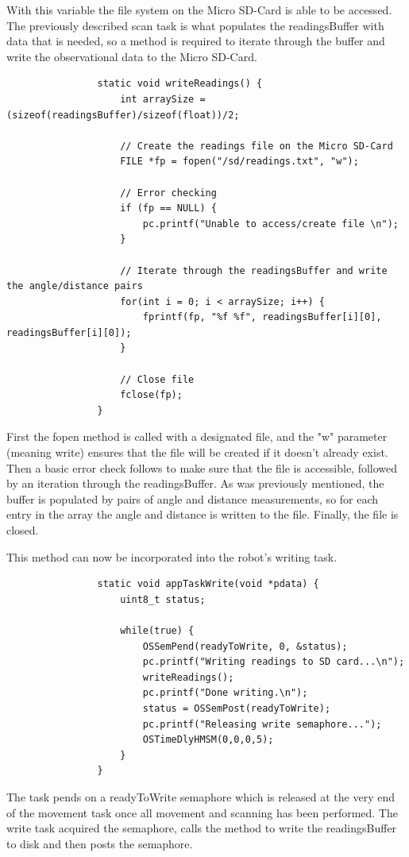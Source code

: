 				With this variable the file system on the Micro SD-Card is able to be accessed. The previously described scan task is what populates the readingsBuffer with data that is needed, so a method is required to iterate through the buffer and write the observational data to the Micro SD-Card.
				
				\begin{lstlisting}
				static void writeReadings() {
					int arraySize = (sizeof(readingsBuffer)/sizeof(float))/2;
				
					// Create the readings file on the Micro SD-Card
					FILE *fp = fopen("/sd/readings.txt", "w");
				
					// Error checking
					if (fp == NULL) {
						pc.printf("Unable to access/create file \n");
					}
				
					// Iterate through the readingsBuffer and write the angle/distance pairs
					for(int i = 0; i < arraySize; i++) {
						fprintf(fp, "%f %f", readingsBuffer[i][0], readingsBuffer[i][0]);
					}
				
					// Close file
					fclose(fp);
				}
				\end{lstlisting}
				First the fopen method is called with a designated file, and the "w" parameter (meaning write) ensures that the file will be created if it doesn't already exist. Then a basic error check follows to make sure that the file is accessible, followed by an iteration through the readingsBuffer. As was previously mentioned, the buffer is populated by pairs of angle and distance measurements, so for each entry in the array the angle and distance is written to the file. Finally, the file is closed.
				
				This method can now be incorporated into the robot's writing task.
				
				\begin{lstlisting}
				static void appTaskWrite(void *pdata) {
					uint8_t status;
				
					while(true) {
						OSSemPend(readyToWrite, 0, &status);
						pc.printf("Writing readings to SD card...\n");
						writeReadings();
						pc.printf("Done writing.\n");
						status = OSSemPost(readyToWrite);
						pc.printf("Releasing write semaphore...");
						OSTimeDlyHMSM(0,0,0,5);
					}
				}
				\end{lstlisting}
				The task pends on a readyToWrite semaphore which is released at the very end of the movement task once all movement and scanning has been performed. The write task acquired the semaphore, calls the method to write the readingsBuffer to disk and then posts the semaphore.
	
